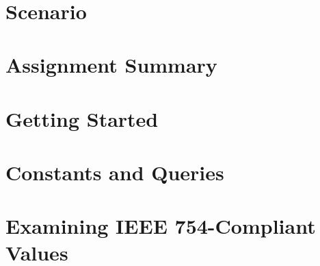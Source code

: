 




\renewcommand{\labnumber}{\floatlabnumber}
\renewcommand{\labname}{Floating Point Representation and Arithmetic Lab}
\renewcommand{\shortlabname}{floatlab}
\renewcommand{\collaborationrules}{\floatlabcollaboration}
\renewcommand{\duedate}{\floatlabdue}

\pagelayout

    \labidentifier\


    \softwareengineeringfrontmatter

    \section*{Scenario}                                                 \WriteAnFPU

    \section{Assignment Summary}                                        

    \section{Getting Started}                                           

    \section{Constants and Queries} \label{sec:constantsAndQueries}     

    \section{Examining IEEE 754-Compliant Values}                       

